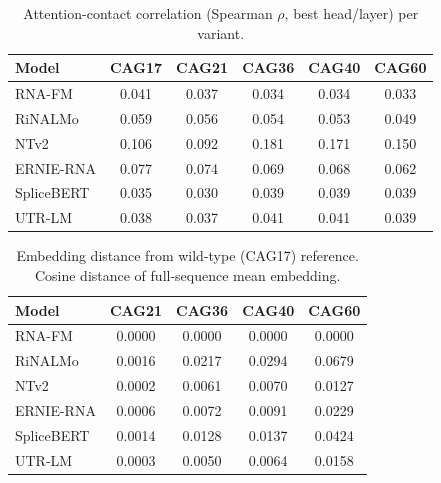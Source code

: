 \documentclass[11pt]{article}
\begin{document}
\begin{table}[h]
\centering
\small
\caption{Attention-contact correlation (Spearman $\rho$, best
  head/layer) per variant.}
\begin{tabular}{@{}lccccc@{}}
\toprule
\textbf{Model} & \textbf{CAG17} & \textbf{CAG21} &
  \textbf{CAG36} & \textbf{CAG40} & \textbf{CAG60} \\
\midrule
RNA-FM     & 0.041 & 0.037 & 0.034 & 0.034 & 0.033 \\
RiNALMo    & 0.059 & 0.056 & 0.054 & 0.053 & 0.049 \\
NTv2       & 0.106 & 0.092 & 0.181 & 0.171 & 0.150 \\
ERNIE-RNA  & 0.077 & 0.074 & 0.069 & 0.068 & 0.062 \\
SpliceBERT & 0.035 & 0.030 & 0.039 & 0.039 & 0.039 \\
UTR-LM     & 0.038 & 0.037 & 0.041 & 0.041 & 0.039 \\
\bottomrule
\end{tabular}
\end{table}

\begin{table}[h]
\centering
\small
\caption{Embedding distance from wild-type (CAG17) reference.
  Cosine distance of full-sequence mean embedding.}
\begin{tabular}{@{}lcccc@{}}
\toprule
\textbf{Model} & \textbf{CAG21} & \textbf{CAG36} &
  \textbf{CAG40} & \textbf{CAG60} \\
\midrule
RNA-FM     & 0.0000 & 0.0000 & 0.0000 & 0.0000 \\
RiNALMo    & 0.0016 & 0.0217 & 0.0294 & 0.0679 \\
NTv2       & 0.0002 & 0.0061 & 0.0070 & 0.0127 \\
ERNIE-RNA  & 0.0006 & 0.0072 & 0.0091 & 0.0229 \\
SpliceBERT & 0.0014 & 0.0128 & 0.0137 & 0.0424 \\
UTR-LM     & 0.0003 & 0.0050 & 0.0064 & 0.0158 \\
\bottomrule
\end{tabular}
\end{table}
\end{document}
